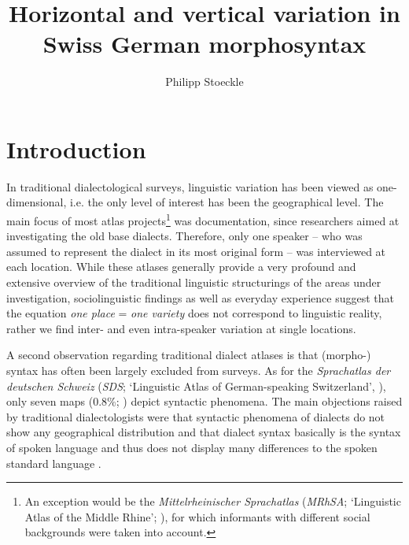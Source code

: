 \documentclass[output=paper]{LSP/langsci}
\author{Philipp Stoeckle\affiliation{University of Zürich}}
\title{Horizontal and vertical variation in Swiss German morphosyntax}
\begin{document}
 

\section{Introduction}
In traditional dialectological surveys, linguistic variation has been viewed as one-dimensional, i.e. the only level of interest has been the geographical level. The main focus of most atlas projects\footnote{ An exception would be the \emph{Mittelrheinischer Sprachatlas} (\emph{MRhSA}; ‘Linguistic Atlas of the Middle Rhine’; \citealt{bellmann_mittelrheinischer_1994}), for which informants with different social backgrounds were taken into account.} was documentation, since researchers aimed at investigating the old base dialects. Therefore, only one speaker – who was assumed to represent the dialect in its most original form – was interviewed at each location. While these atlases generally provide a very profound and extensive overview of the traditional linguistic structurings of the areas under investigation, sociolinguistic findings as well as everyday experience suggest that the equation \emph{one place} = \emph{one variety} does not correspond to linguistic reality, rather we find inter- and even intra-speaker variation at single locations.

A second observation regarding traditional dialect atlases is that (morpho-) syntax has often been largely excluded from surveys. As for the \emph{Sprachatlas der deutschen Schweiz} (\emph{SDS}; ‘Linguistic Atlas of German-speaking Switzerland’, \citealt{hotzenkocherle_sprachatlas_1962}), only seven maps (0.8\%; \citealt[42]{bucheli_syntactic_2002}) depict syntactic phenomena. The main objections raised by traditional dialectologists were that syntactic phenomena of dialects do not show any geographical distribution and that dialect syntax basically is the syntax of spoken language and thus does not display many differences to the spoken standard language \citep[109]{loffler_dialektologie._2003}.
\end{document}
